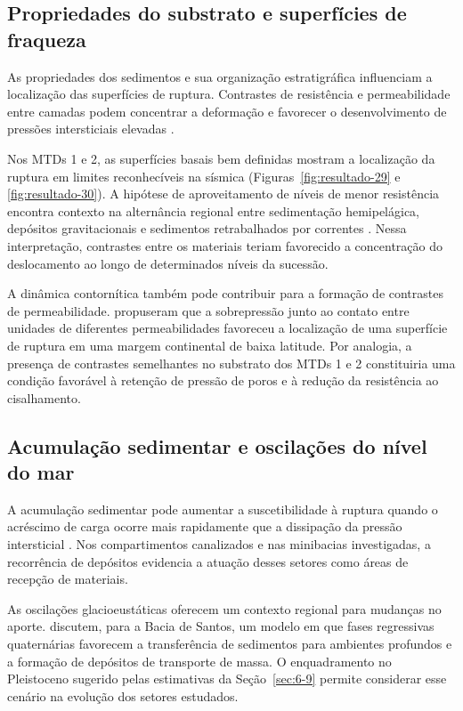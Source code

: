 \subsection{Propriedades do substrato e superfícies de fraqueza}\label{sec:6-7-1}

As propriedades dos sedimentos e sua organização estratigráfica influenciam a localização das superfícies de ruptura. Contrastes de resistência e permeabilidade entre camadas podem concentrar a deformação e favorecer o desenvolvimento de pressões intersticiais elevadas \cite{hampton1996,talling2014}.

Nos MTDs 1 e 2, as superfícies basais bem definidas mostram a localização da ruptura em limites reconhecíveis na sísmica (Figuras~\ref{fig:resultado-29} e \ref{fig:resultado-30}). A hipótese de aproveitamento de níveis de menor resistência encontra contexto na alternância regional entre sedimentação hemipelágica, depósitos gravitacionais e sedimentos retrabalhados por correntes \cite{moreira2007,duarte2007}. Nessa interpretação, contrastes entre os materiais teriam favorecido a concentração do deslocamento ao longo de determinados níveis da sucessão.

A dinâmica contornítica também pode contribuir para a formação de contrastes de permeabilidade.  propuseram que a sobrepressão junto ao contato entre unidades de diferentes permeabilidades favoreceu a localização de uma superfície de ruptura em uma margem continental de baixa latitude. Por analogia, a presença de contrastes semelhantes no substrato dos MTDs 1 e 2 constituiria uma condição favorável à retenção de pressão de poros e à redução da resistência ao cisalhamento.

\subsection{Acumulação sedimentar e oscilações do nível do mar}\label{sec:6-7-2}

A acumulação sedimentar pode aumentar a suscetibilidade à ruptura quando o acréscimo de carga ocorre mais rapidamente que a dissipação da pressão intersticial \cite{lee2007,talling2014,urlaub2015}. Nos compartimentos canalizados e nas minibacias investigadas, a recorrência de depósitos evidencia a atuação desses setores como áreas de recepção de materiais.

As oscilações glacioeustáticas oferecem um contexto regional para mudanças no aporte.  discutem, para a Bacia de Santos, um modelo em que fases regressivas quaternárias favorecem a transferência de sedimentos para ambientes profundos e a formação de depósitos de transporte de massa. O enquadramento no Pleistoceno sugerido pelas estimativas da Seção~\ref{sec:6-9} permite considerar esse cenário na evolução dos setores estudados.

